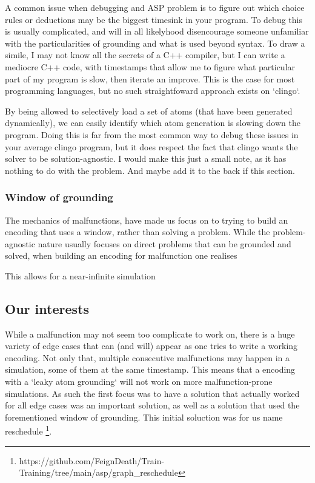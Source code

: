 A common issue when debugging and ASP problem is to figure out which choice rules or deductions may be the biggest timesink in your program. To debug this is usually complicated, and will in all likelyhood disencourage someone unfamiliar with the particularities of grounding and what is used beyond syntax. To draw a simile, I may not know all the secrets of a C++ compiler, but I can write a mediocre C++ code, with timestamps that allow me to figure what particular part of my program is slow, then iterate an improve. This is the case for most programming languages, but no such straightfoward approach exists on `clingo`.

By being allowed to selectively load a set of atoms (that have been generated dynamically), we can easily identify which atom generation is slowing down the program. Doing this is far from the most common way to debug these issues in your average clingo program, but it does respect the fact that clingo wants the solver to be solution-agnostic. 
\color{black} \color{gray} I would make this just a small note, as it has nothing to do with the problem. And maybe add it to the back if this section. \color{black}


\subsubsection{Window of grounding}

The mechanics of malfunctions, have made us focus on to trying to build an encoding that uses a window, rather than solving a problem. While the problem-agnostic nature usually focuses on direct problems that can be grounded and solved, when building an encoding for malfunction one realises 

This allows for a near-infinite simulation 
 
 

\color{black}

\subsection{Our interests}

While a malfunction may not seem too complicate to work on, there is a huge variety of edge cases that can (and will) appear as one tries to write a working encoding. Not only that, multiple consecutive malfunctions may happen in a simulation, some of them at the same timestamp. This means that a encoding with a `leaky atom grounding` will not work on more malfunction-prone simulations. As such the first focus was to have a solution that actually worked for all edge cases was an important solution, as well as a solution that used the forementioned window of grounding. This initial soluction was for us name reschedule \footnote{https://github.com/FeignDeath/Train-Training/tree/main/asp/graph\_reschedule}. 


